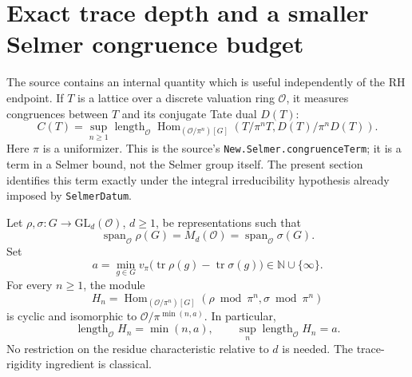 \section{Exact trace depth and a smaller Selmer congruence budget}
\label{sec:trace-depth}

The source contains an internal quantity which is useful independently of
the RH endpoint.  If $T$ is a lattice over a discrete valuation ring
$\mathcal O$, it measures congruences between $T$ and its conjugate Tate
dual $D(T)$:
\[
 C(T)=\sup_{n\geq1}\operatorname{length}_{\mathcal O}
 \operatorname{Hom}_{(\mathcal O/\pi^n)[G]}
       (T/\pi^nT,D(T)/\pi^nD(T)).
\]
Here $\pi$ is a uniformizer.  This is the source's
\texttt{New.Selmer.congruenceTerm}; it is a term in a Selmer bound,
not the Selmer group itself.  The present section identifies this term
exactly under the integral irreducibility hypothesis already imposed
by \texttt{SelmerDatum}.\cite{selmerdata}

\begin{theorem}
\label{thm:trace-depth}
Let $\rho,\sigma:G\to\mathrm{GL}_d(\mathcal O)$, $d\geq1$, be
representations such that
\[
 \operatorname{span}_{\mathcal O}\rho(G)
  =M_d(\mathcal O)
  =\operatorname{span}_{\mathcal O}\sigma(G).
\]
Set
\[
 a=\min_{g\in G}v_\pi\bigl(\operatorname{tr}\rho(g)
                       -\operatorname{tr}\sigma(g)\bigr)
       \in\mathbb N\cup\{\infty\}.
\]
For every $n\geq1$, the module
\[
 H_n=\operatorname{Hom}_{(\mathcal O/\pi^n)[G]}
           (\rho\bmod\pi^n,\sigma\bmod\pi^n)
\]
is cyclic and isomorphic to
$\mathcal O/\pi^{\min(n,a)}$.  In particular,
\[
 \operatorname{length}_{\mathcal O}H_n=\min(n,a),
 \qquad \sup_n\operatorname{length}_{\mathcal O}H_n=a.
\]
No restriction on the residue characteristic relative to $d$ is needed. The trace-rigidity ingredient is classical.\cite{carayol}
\end{theorem}

